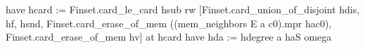   have hcard := Finset.card_le_card hsub
  rw [Finset.card_union_of_disjoint hdis, hf, hsnd,
    Finset.card_erase_of_mem ((mem_neighbors E a c0).mpr hac0),
    Finset.card_erase_of_mem hv] at hcard
  have hda := hdegree a haS
  omega
